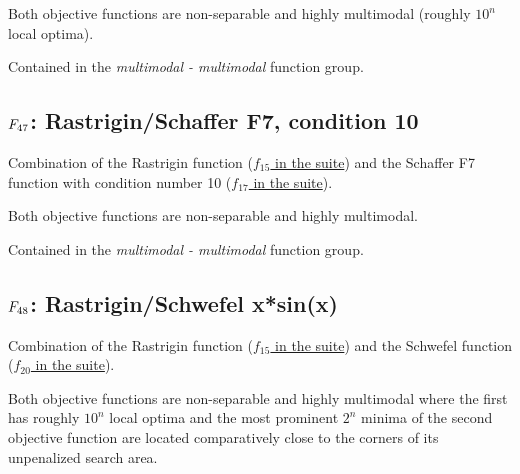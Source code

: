Both objective functions are non-separable and highly multimodal
(roughly \(10^n\) local optima).

Contained in the \emph{multimodal - multimodal} function group.



\subsection[\texorpdfstring{\protect\(F_{47}\protect\): Rastrigin/Schaffer F7, condition 10}{F47: Rastrigin/Schaffer F7, condition 10}]{\texorpdfstring{\protect\(F_{47}\protect\): Rastrigin/Schaffer F7, condition 10}{}}
\label{index:rastrigin-schaffer-f7-condition-10}\label{index:f47}
Combination of the Rastrigin function
(\href{https://coco.gforge.inria.fr/downloads/download16.00/bbobdocfunctions.pdf\#page=75}{\(f_{15}\) in the \bbob suite}) and the Schaffer F7 function with
condition number 10 (\href{https://coco.gforge.inria.fr/downloads/download16.00/bbobdocfunctions.pdf\#page=85}{\(f_{17}\) in the \bbob suite}).

Both objective functions are non-separable and highly multimodal.

Contained in the \emph{multimodal - multimodal} function group.



\subsection[\texorpdfstring{\protect\(F_{48}\protect\): Rastrigin/Schwefel x*sin(x)}{F48: Rastrigin/Schwefel x*sin(x)}]{\texorpdfstring{\protect\(F_{48}\protect\): Rastrigin/Schwefel x*sin(x)}{}}
\label{index:f48}\label{index:rastrigin-schwefel-x-sin-x}
Combination of the Rastrigin function
(\href{https://coco.gforge.inria.fr/downloads/download16.00/bbobdocfunctions.pdf\#page=75}{\(f_{15}\) in the \bbob suite}) and the Schwefel function (\href{https://coco.gforge.inria.fr/downloads/download16.00/bbobdocfunctions.pdf\#page=100}{\(f_{20}\) in the \bbob suite}).

Both objective functions are non-separable and highly multimodal where
the first has roughly \(10^n\) local optima and the most prominent
\(2^n\) minima of the second objective function are located
comparatively close to the corners of its unpenalized search area.

